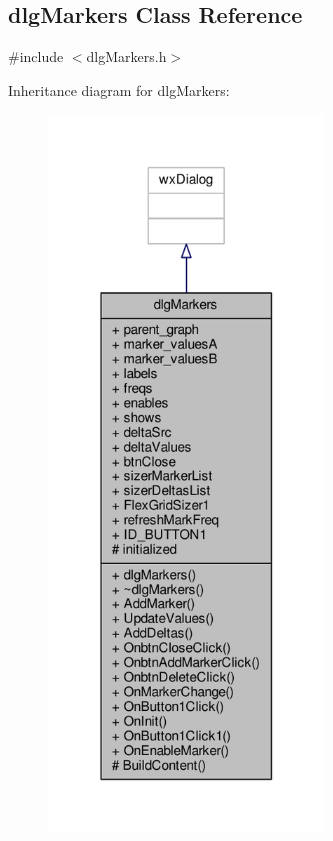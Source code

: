 \subsection{dlg\+Markers Class Reference}
\label{classdlgMarkers}


{\ttfamily \#include $<$dlg\+Markers.\+h$>$}



Inheritance diagram for dlg\+Markers\+:
\nopagebreak
\begin{figure}[H]
\begin{center}
\leavevmode
\includegraphics[width=208pt]{da/d21/classdlgMarkers__inherit__graph}
\end{center}
\end{figure}



